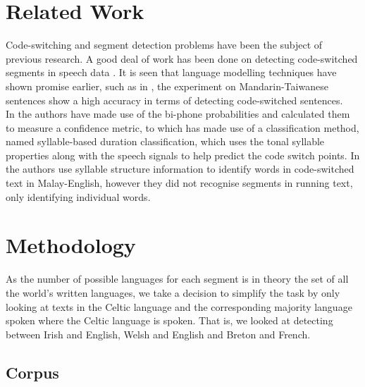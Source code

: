 \documentclass[11pt]{article}
\begin{document}
\section{Related Work}
\label{sec:relwork}

Code-switching and segment detection problems have been the subject of previous research. A good deal of work
has been done on detecting code-switched segments in speech data \cite{chan2004detection,lyu2006language}.
It is seen that language modelling techniques have shown promise earlier, such as in , 
the experiment on Mandarin-Taiwanese sentences show a high accuracy in terms of detecting code-switched sentences. \\

In  the authors have made use of the bi-phone probabilities and calculated them to measure a confidence metric, 
to \cite{lyu2006language} which has made use of a classification method, named syllable-based duration classification, 
which uses the tonal syllable properties along with the speech signals to help predict the code switch points. In  
 the authors use syllable structure information to identify words in code-switched text in Malay-English, however they did not 
recognise segments in running text, only identifying individual words.


\section{Methodology}
\label{sec:method}

As the number of possible languages for each segment is in theory the set of all the world's written languages, we take 
a decision to simplify the task by only looking at texts in the Celtic language and the corresponding majority language spoken
where the Celtic language is spoken. That is, we looked at detecting between Irish and English, Welsh and English 
and Breton and French.

\subsection{Corpus}
\end{document}
